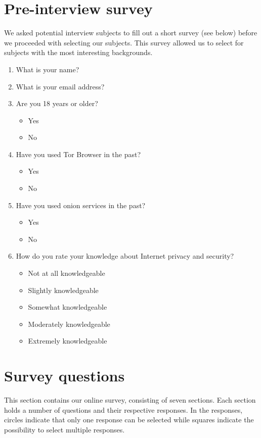 \appendix

\section{Pre-interview survey}
\label{sec:interview-survey}
We asked potential interview subjects to fill out a short survey (see below)
before we proceeded with selecting our subjects.  This survey allowed us to
select for subjects with the most interesting backgrounds.

\begin{enumerate}
    \item What is your name?
    \item What is your email address?
    \item Are you 18 years or older?
        \begin{itemize}[label=$\Circle$]
            \item Yes
            \item No
        \end{itemize}
    \item Have you used Tor Browser in the past?
        \begin{itemize}[label=$\Circle$]
            \item Yes
            \item No
        \end{itemize}
    \item Have you used onion services in the past?
        \begin{itemize}[label=$\Circle$]
            \item Yes
            \item No
        \end{itemize}
    \item How do you rate your knowledge about Internet privacy and security?
        \begin{itemize}[label=$\Circle$]
            \item Not at all knowledgeable
            \item Slightly knowledgeable
            \item Somewhat knowledgeable
            \item Moderately knowledgeable
            \item Extremely knowledgeable
        \end{itemize}
\end{enumerate}

\section{Survey questions}
\label{app:survey}
This section contains our online survey, consisting of seven sections.  Each
section holds a number of questions and their respective responses.  In the
responses, circles indicate that only one response can be selected while squares
indicate the possibility to select multiple responses.

